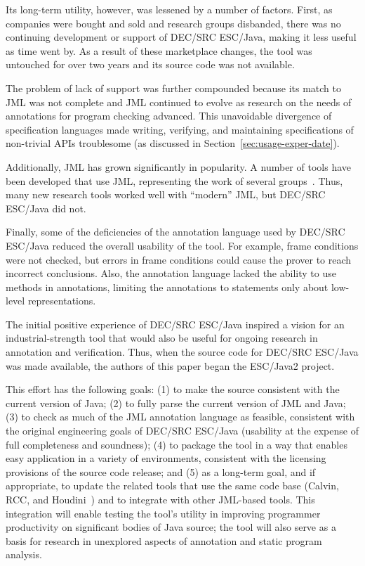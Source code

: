 \documentclass{article}
\begin{document}
Its long-term utility, however, was lessened by a number of factors.
First, as companies were bought and sold and research groups
disbanded, there was no continuing development or support of DEC/SRC
ESC/Java, making it less useful as time went by.  As a result of these
marketplace changes, the tool was untouched for over two years and its
source code was not available.  

The problem of lack of support was further compounded because its
match to JML was not complete and JML continued to evolve as
research on the needs of annotations for program checking advanced.
This unavoidable divergence of specification languages made writing,
verifying, and maintaining specifications of non-trivial APIs
troublesome (as discussed in Section~\ref{sec:usage-exper-date}).

Additionally, JML has grown significantly in popularity.  A number of
tools have been developed that use JML, representing the work of several
groups~\cite{Burdy-etal03,jmlpapers,Bogor03,NimmerErnst01,Leavens-etal00}.
Thus, many new research tools worked well with ``modern'' JML, but
DEC/SRC ESC/Java did not.

Finally, some of the deficiencies of the annotation language used by
DEC/SRC ESC/Java reduced the overall usability of the tool.  For
example, frame conditions were not checked, but errors in frame
conditions could cause the prover to reach incorrect conclusions.
Also, the annotation language lacked the ability to use methods in
annotations, limiting the annotations to statements only about
low-level representations.

The initial positive experience of DEC/SRC ESC/Java inspired a vision
for an industrial-strength tool that would also be useful for ongoing
research in annotation and verification.  Thus, when the source code
for DEC/SRC ESC/Java was made available, the authors of this paper
began the ESC/Java2 project.  

This effort has the following goals:
(1) to make the source consistent with the current version of Java;
(2) to fully parse the current version of JML and Java;
(3) to check as much of the JML annotation language as feasible,
consistent with the original engineering goals of DEC/SRC ESC/Java
(usability at the expense of full completeness and soundness); 
(4) to package the tool in a way that enables easy application in a
variety of environments, consistent with the licensing provisions of
the source code release;
and
(5) as a long-term goal, and if appropriate, to update the related
tools that use the same code base (Calvin, RCC, and Houdini~\cite{flanagan01houdini}) and to
integrate with other JML-based tools.  This integration will
enable testing the tool's utility in improving programmer
productivity on significant bodies of Java source;
the tool will also serve as a basis for research in unexplored aspects of
annotation and static program analysis.
  
\end{document}
